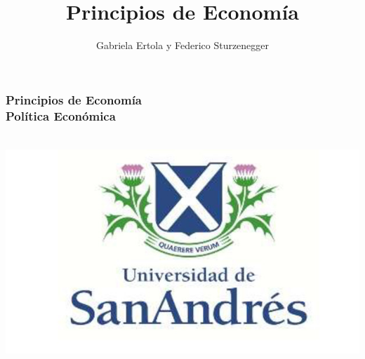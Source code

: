 \documentclass{beamer}
\title[Principios de Economía]{Principios de Economía}
\date{}
\author[Ertola y Sturzenegger]{Gabriela Ertola y Federico Sturzenegger }
\institute[]{Universidad de San Andrés \\
2022}
\begin{document}
\begin{frame}
\frametitle{Principios de Economía
\centering
\\ \vspace{12mm} Política Económica}
\centering
 \\ \vspace{12mm} %
\includegraphics[scale=0.25]{Figures/logoUDESA.jpg} 

\end{frame}
\end{document}
